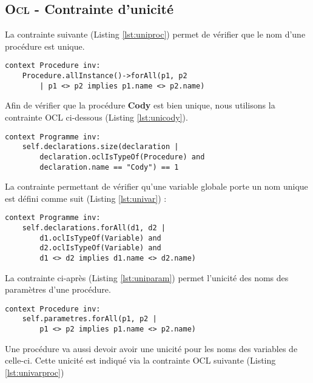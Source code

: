 
\subsection{\textsc{Ocl} - Contrainte d'unicité}
\label{sec:question11}

La contrainte suivante (Listing \ref{lst:uniproc}) permet de vérifier que le nom d'une procédure est unique.

\begin{lstlisting}[caption={Unicité des noms des procédures},captionpos=b,label={lst:uniproc},language=OCL]
context Procedure inv:
	Procedure.allInstance()->forAll(p1, p2 
		| p1 <> p2 implies p1.name <> p2.name)
\end{lstlisting}

Afin de vérifier que la procédure \textbf{Cody} est bien unique, nous utilisons la contrainte OCL ci-dessous (Listing \ref{lst:unicody}).

\begin{lstlisting}[caption={Unicité de la procédure Cody dans le programme},captionpos=b,label={lst:unicody},language=OCL]
context Programme inv:
	self.declarations.size(declaration |
		declaration.oclIsTypeOf(Procedure) and 
		declaration.name == "Cody") == 1
\end{lstlisting}

La contrainte permettant de vérifier qu'une variable globale porte un nom unique est défini comme suit (Listing \ref{lst:univar}) :

\begin{lstlisting}[caption={Unicité des noms des variables},captionpos=b,label={lst:univar},language=OCL]
context Programme inv:
	self.declarations.forAll(d1, d2 |
		d1.oclIsTypeOf(Variable) and
		d2.oclIsTypeOf(Variable) and
		d1 <> d2 implies d1.name <> d2.name)
\end{lstlisting}

La contrainte ci-après (Listing \ref{lst:uniparam}) permet l'unicité des noms des paramètres d'une procédure.

\begin{lstlisting}[caption={Unicité des noms des paramètres d'une procédure},captionpos=b,label={lst:uniparam},language=OCL]
context Procedure inv:
	self.parametres.forAll(p1, p2 |
		p1 <> p2 implies p1.name <> p2.name)
\end{lstlisting}

Une procédure va aussi devoir avoir une unicité pour les noms des variables de celle-ci. Cette unicité est indiqué via la contrainte OCL suivante (Listing \ref{lst:univarproc})

